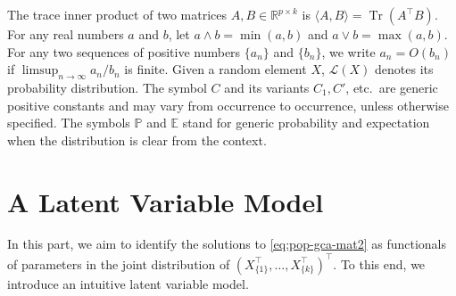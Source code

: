 \documentclass[11pt]{article}
\newcommand{\dc}[1]{\{#1\}} %
\DeclareMathOperator{\Tr}{Tr}
\newcommand{\0}{{\mathbf{0}}}
\begin{document}
The trace inner product of two matrices $A, B \in \mathbb{R}^{p\times k}$ is $\langle A, B\rangle  = \Tr(A^\top B)$. 
For any real numbers $a$ and $b$, let $a\wedge b = \min(a,b)$ and $a\vee b = \max(a,b)$.
For any two sequences of positive numbers $\{a_n\}$ and $\{b_n\}$, we write $a_n = O(b_n)$ if $\limsup_{n\to\infty} a_n/b_n$ is finite.
Given a random element $X$, $\mathcal{L}(X)$ denotes its probability distribution. The symbol $C$ and its variants $C_1, C'$, etc.~are generic positive constants
and may vary from occurrence to occurrence, unless otherwise specified. The symbols $\mathbb{P}$ and $\mathbb{E}$ stand for generic probability and expectation when the distribution is clear from the context.

\section{A Latent Variable Model}
\label{sec:latent}

\iffalse
We have formulated the GCA problem as an optimization problem, which is non-convex due to the constraint. It is also of the form of a generalized eigenvalue problem and we define $\lambda_1, \lambda_2,...\lambda_p$ to be its generalized eigenvalues in decreasing order. We also call them the \textit{generalized canonical scores} in the Sparse GCA model. We want a universal algorithm that works for all possible values of $k$ and $\{p_i\}_{i=1}^k$. (\textit{Maybe should be moved/merged to section I})
\fi 



In this part, we aim to identify the solutions to \eqref{eq:pop-gca-mat2} as functionals of parameters in the joint distribution of 
$({ X_{\dc{1}}^\top} ,\dots, { X_{\dc{k}}^\top} )^\top $.
To this end, we introduce an intuitive latent variable model.
\end{document}
